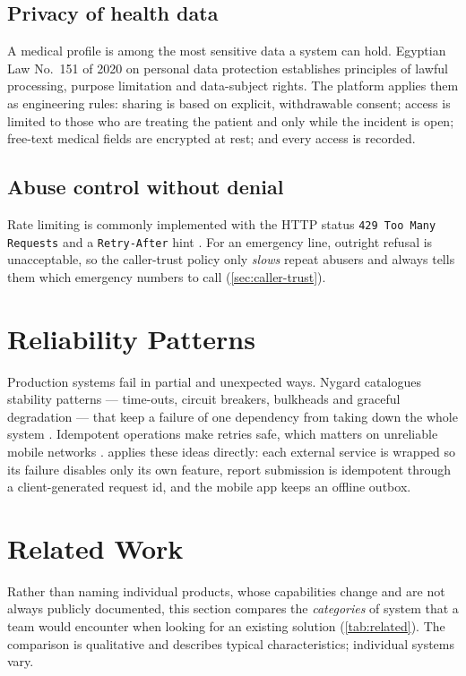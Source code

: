 \subsection{Privacy of health data}
A medical profile is among the most sensitive data a system can hold. Egyptian Law No.\ 151 of 2020 on personal
data protection \cite{egypt2020pdpl} establishes principles of lawful processing, purpose limitation and data-subject
rights. The platform applies them as engineering rules: sharing is based on explicit, withdrawable consent; access
is limited to those who are treating the patient and only while the incident is open; free-text medical fields are
encrypted at rest; and every access is recorded.

\subsection{Abuse control without denial}
Rate limiting is commonly implemented with the HTTP status \texttt{429 Too Many Requests} and a
\texttt{Retry-After} hint \cite{rfc6585}. For an emergency line, outright refusal is unacceptable, so the caller-trust policy
only \emph{slows} repeat abusers and always tells them which emergency numbers to call (\cref{sec:caller-trust}).

\section{Reliability Patterns}

Production systems fail in partial and unexpected ways. Nygard catalogues stability patterns --- time-outs, circuit
breakers, bulkheads and graceful degradation --- that keep a failure of one dependency from taking down the
whole system \cite{nygard2018release}. Idempotent operations make retries safe, which matters on unreliable mobile
networks \cite{kleppmann2017ddia}. \ProjectName{} applies these ideas directly: each external service is wrapped so its
failure disables only its own feature, report submission is idempotent through a client-generated request id, and
the mobile app keeps an offline outbox.

\section{Related Work}

Rather than naming individual products, whose capabilities change and are not always publicly documented, this
section compares the \emph{categories} of system that a team would encounter when looking for an existing solution
(\cref{tab:related}). The comparison is qualitative and describes typical characteristics; individual systems vary.

